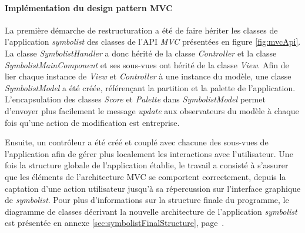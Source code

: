 \paragraph{Implémentation du design pattern MVC} La première démarche de restructuration a été de faire hériter les classes de l'application \textit{symbolist} des classes de l'API \textit{MVC} présentées en figure \ref{fig:mvcApi}.
La classe \textit{SymbolistHandler} a donc hérité de la classe \textit{Controller} et la classe \textit{SymbolistMainComponent} et ses sous-vues ont hérité de la classe \textit{View}.
Afin de lier chaque instance de \textit{View} et \textit{Controller} à une instance du modèle, une classe \textit{SymbolistModel} a été créée, référençant la partition et la palette de l'application.
L'encapsulation des classes \textit{Score} et \textit{Palette} dans \textit{SymbolistModel} permet d'envoyer plus facilement le message \textit{update} aux observateurs du modèle à chaque fois qu'une action de modification est entreprise.

Ensuite, un contrôleur a été créé et couplé avec chacune des sous-vues de l'application afin de gérer plus localement les interactions avec l'utilisateur.  
Une fois la structure globale de l'application établie, le travail a consisté à s'assurer que les éléments de l'architecture MVC se comportent correctement, depuis la captation d'une action utilisateur jusqu'à sa répercussion sur l'interface graphique de \textit{symbolist}.
Pour plus d'informations sur la structure finale du programme, le diagramme de classes décrivant la nouvelle architecture de l'application \textit{symbolist} est présentée en annexe \ref{sec:symbolistFinalStructure}, page~\pageref{sec:symbolistFinalStructure}.

